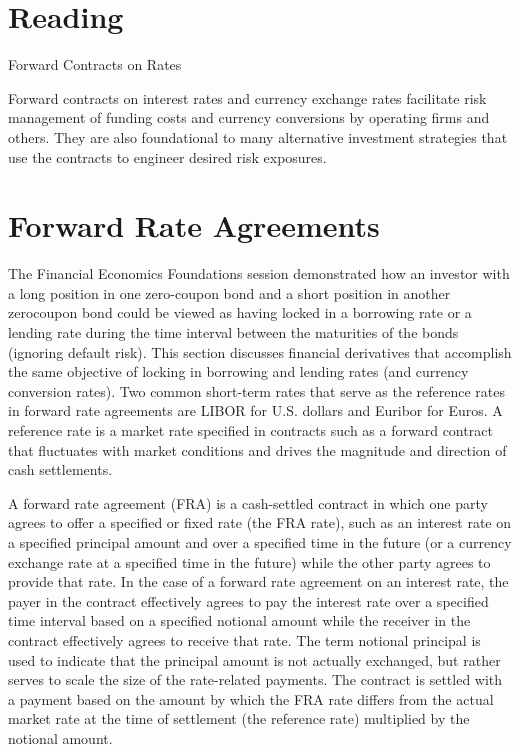 \documentclass[11pt]{article}
\begin{document}
\section*{Reading}
Forward Contracts on Rates

Forward contracts on interest rates and currency exchange rates facilitate risk management of funding costs and currency conversions by operating firms and others. They are also foundational to many alternative investment strategies that use the contracts to engineer desired risk exposures.

\section*{Forward Rate Agreements}
The Financial Economics Foundations session demonstrated how an investor with a long position in one zero-coupon bond and a short position in another zerocoupon bond could be viewed as having locked in a borrowing rate or a lending rate during the time interval between the maturities of the bonds (ignoring default risk). This section discusses financial derivatives that accomplish the same objective of locking in borrowing and lending rates (and currency conversion rates). Two common short-term rates that serve as the reference rates in forward rate agreements are LIBOR for U.S. dollars and Euribor for Euros. A reference rate is a market rate specified in contracts such as a forward contract that fluctuates with market conditions and drives the magnitude and direction of cash settlements.

A forward rate agreement (FRA) is a cash-settled contract in which one party agrees to offer a specified or fixed rate (the FRA rate), such as an interest rate on a specified principal amount and over a specified time in the future (or a currency exchange rate at a specified time in the future) while the other party agrees to provide that rate. In the case of a forward rate agreement on an interest rate, the payer in the contract effectively agrees to pay the interest rate over a specified time interval based on a specified notional amount while the receiver in the contract effectively agrees to receive that rate. The term notional principal is used to indicate that the principal amount is not actually exchanged, but rather serves to scale the size of the rate-related payments. The contract is settled with a payment based on the amount by which the FRA rate differs from the actual market rate at the time of settlement (the reference rate) multiplied by the notional amount.
\end{document}
